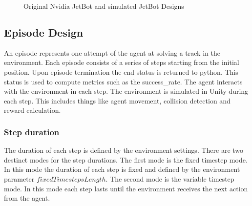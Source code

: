 \begin{figure}
    \centering
    \qquad
    \qquad
    \qquad
    \caption{Original Nvidia JetBot and simulated JetBot Designs}
    \label{fig:jetbots}
\end{figure} %


\subsection{Episode Design}

An episode represents one attempt of the agent at solving a track in the environment. Each episode consists of a series of steps starting from the initial position. Upon episode termination the end status is returned to python. This status is used to compute metrics such as the success\_rate. The agent interacts with the environment in each step. The environment is simulated in Unity during each step. This includes things like agent movement, collision detection and reward calculation.

\subsubsection{Step duration}
The duration of each step is defined by the environment settings. There are two destinct modes for the step durations. The first mode is the fixed timestep mode. In this mode the duration of each step is fixed and defined by the environment parameter $fixedTimestepsLength$. The second mode is the variable timestep mode. In this mode each step lasts until the environment receives the next action from the agent.

